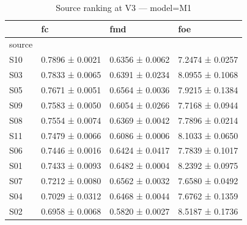 \begin{table}[htbp]
\centering
\caption{Source ranking at V3 — model=M1}
\label{tab:rank:M1}
\begin{tabular}{llll}
\toprule
\toprule
 & fc & fmd & foe \\
\midrule
source &  &  &  \\
\midrule
S10 & 0.7896 ± 0.0021 & 0.6356 ± 0.0062 & 7.2474 ± 0.0257 \\
S03 & 0.7833 ± 0.0065 & 0.6391 ± 0.0234 & 8.0955 ± 0.1068 \\
S05 & 0.7671 ± 0.0051 & 0.6564 ± 0.0036 & 7.9215 ± 0.1384 \\
S09 & 0.7583 ± 0.0050 & 0.6054 ± 0.0266 & 7.7168 ± 0.0944 \\
S08 & 0.7554 ± 0.0074 & 0.6369 ± 0.0042 & 7.7896 ± 0.0214 \\
S11 & 0.7479 ± 0.0066 & 0.6086 ± 0.0006 & 8.1033 ± 0.0650 \\
S06 & 0.7446 ± 0.0016 & 0.6424 ± 0.0417 & 7.7839 ± 0.1017 \\
S01 & 0.7433 ± 0.0093 & 0.6482 ± 0.0004 & 8.2392 ± 0.0975 \\
S07 & 0.7212 ± 0.0080 & 0.6562 ± 0.0032 & 7.6580 ± 0.0492 \\
S04 & 0.7029 ± 0.0312 & 0.6468 ± 0.0044 & 7.6762 ± 0.1359 \\
S02 & 0.6958 ± 0.0068 & 0.5820 ± 0.0027 & 8.5187 ± 0.1736 \\
\bottomrule
\end{tabular}\end{table}
